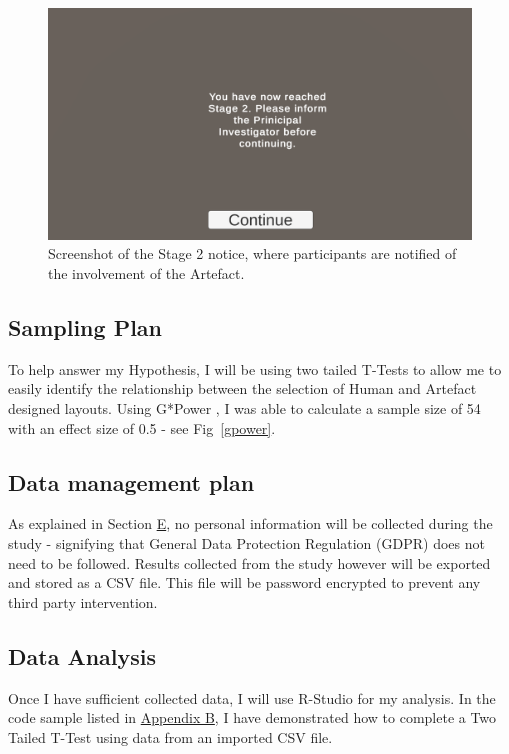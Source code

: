 \begin{figure}[!h]
    \includegraphics[width=\columnwidth]{./Images/stage-2-notice.png}
    \centering
    \caption{Screenshot of the Stage 2 notice, where participants are notified of the involvement of the Artefact.}
    \label{stage-2}
\end{figure}


\subsection{Sampling Plan}
To help answer my Hypothesis, I will be using two tailed T-Tests to allow me to easily identify the relationship between the selection of Human and Artefact designed layouts.
Using G*Power \cite{gpower}, I was able to calculate a sample size of 54 with an effect size of 0.5 - see Fig~\ref{gpower}. 

\subsection{Data management plan}
As explained in Section \hyperref[ethics]{E}, no personal information will be collected during the study - signifying that General Data Protection Regulation (GDPR) \cite{gdpr} does not need to be followed. Results collected from the study however will be exported and stored as a CSV file. This file will be password encrypted to prevent any third party intervention.


\subsection{Data Analysis}
Once I have sufficient collected data, I will use R-Studio for my analysis. In the code sample listed in \hyperref[append:b]{Appendix B}, I have demonstrated how to complete a Two Tailed T-Test using data from an imported CSV file.

